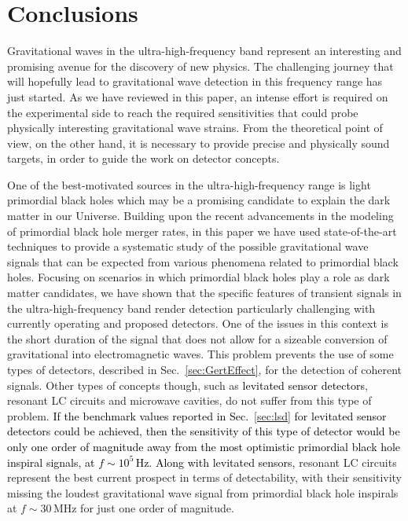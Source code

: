 \documentclass[11pt,a4paper]{article}
\begin{document}
\section{Conclusions}\label{sec:conclusions}

Gravitational waves in the ultra-high-frequency band represent an interesting and promising avenue for the discovery of new physics. The challenging journey that will hopefully lead to gravitational wave detection in this frequency range has just started. As we have reviewed in this paper, an intense effort is required on the experimental side to reach the required sensitivities that could probe physically interesting gravitational wave strains. From the theoretical point of view, on the other hand, it is necessary to provide precise and physically sound targets, in order to guide the work on detector concepts.

One of the best-motivated sources in the ultra-high-frequency range is light primordial black holes which may be a promising candidate to explain the dark matter in our Universe.
Building upon the recent advancements in the modeling of primordial black hole merger rates, in this paper we have used state-of-the-art techniques to provide a systematic study of the possible gravitational wave signals that can be expected from various phenomena related to primordial black holes. 
Focusing on scenarios in which primordial black holes play a role as dark matter candidates, we have shown that the specific features of transient signals in the ultra-high-frequency band render detection particularly challenging with currently operating and proposed detectors. One of the issues in this context is the short duration of the signal that does not allow for a sizeable conversion of gravitational into electromagnetic waves. This problem prevents the use of some types of detectors, described in Sec.~\ref{sec:GertEffect}, for the detection of coherent signals. Other types of concepts though, such as \textcolor{black}{levitated sensor detectors}, resonant LC circuits and microwave cavities, do not suffer from this type of problem. \textcolor{black}{If the benchmark values  reported in Sec.~\ref{sec:lsd} for levitated sensor detectors could be achieved, then the sensitivity of this type of detector would be only one order of magnitude away from the most optimistic primordial black hole inspiral signals, at $f \sim 10^5 \, \text{Hz}$. Along with levitated sensors,} resonant LC circuits represent the best current prospect in terms of detectability, with their sensitivity missing the loudest gravitational wave signal from primordial black hole inspirals at $f \sim 30 \, \text{MHz}$ for just one order of magnitude.
\end{document}

